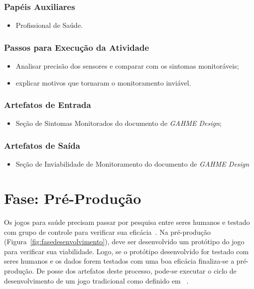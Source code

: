 \subsubsection{Papéis Auxiliares}
\begin{itemize}
	\item Profissional de Saúde.
\end{itemize}

\subsubsection{Passos para Execução da Atividade}
\begin{itemize}
	\item Analisar precisão dos sensores e comparar com os sintomas monitoráveis;
	\item explicar motivos que tornaram o monitoramento inviável.
\end{itemize}

\subsubsection{Artefatos de Entrada}
\begin{itemize}
	\item Seção de Sintomas Monitorados do documento de \textit{GAHME Design};
\end{itemize}

\subsubsection{Artefatos de Saída}
\begin{itemize}
	\item Seção de Inviabilidade de Monitoramento do documento de \textit{GAHME Design}
\end{itemize}



\section{Fase: Pré-Produção}
Os jogos para saúde precisam passar por pesquisa entre seres humanos e testado com grupo de controle para verificar sua eficácia~\cite{kato12}. Na pré-produção (Figura~\ref{fig:fasedesenvolvimento}), deve ser desenvolvido um protótipo do jogo para verificar sua viabilidade. Logo, se o protótipo desenvolvido for testado com seres humanos e os dados forem testados com uma boa eficácia finaliza-se a pré-produção. De posse dos artefatos deste processo, pode-se executar o ciclo de desenvolvimento de um jogo tradicional como definido em ~\cite{fullerton2008game}.

